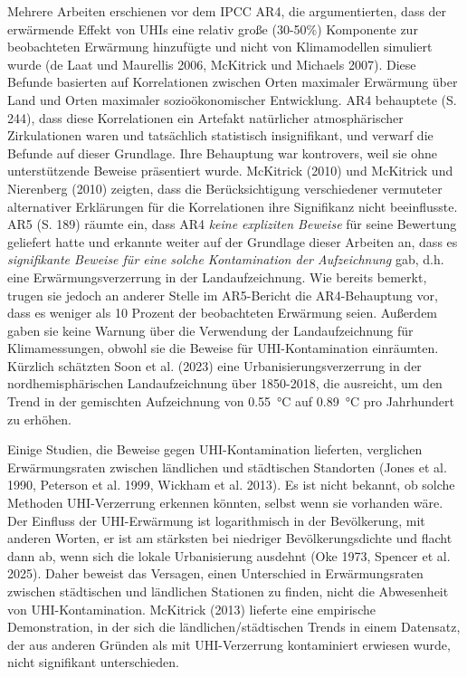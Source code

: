 \documentclass[12pt,paper=a4,DIV=12,parskip=never,chapterprefix=false,headings=standardclasses]{scrreprt}
\numberwithin{figure}{chapter}
\begin{document}
Mehrere Arbeiten erschienen vor dem IPCC AR4, die argumentierten, dass der erwärmende Effekt von UHIs eine relativ große (30-50\%) Komponente zur beobachteten Erwärmung hinzufügte und nicht von Klimamodellen simuliert wurde (de Laat und Maurellis 2006, McKitrick und Michaels 2007). Diese Befunde basierten auf Korrelationen zwischen Orten maximaler Erwärmung über Land und Orten maximaler sozioökonomischer Entwicklung. AR4 behauptete (S. 244), dass diese Korrelationen ein Artefakt natürlicher atmosphärischer Zirkulationen waren und tatsächlich statistisch insignifikant, und verwarf die Befunde auf dieser Grundlage. Ihre Behauptung war kontrovers, weil sie ohne unterstützende Beweise präsentiert wurde. McKitrick (2010) und McKitrick und Nierenberg (2010) zeigten, dass die Berücksichtigung verschiedener vermuteter alternativer Erklärungen für die Korrelationen ihre Signifikanz nicht beeinflusste. AR5 (S. 189) räumte ein, dass AR4 \emph{keine expliziten Beweise} für seine Bewertung geliefert hatte und erkannte weiter auf der Grundlage dieser Arbeiten an, dass es \emph{signifikante Beweise für eine solche Kontamination der Aufzeichnung} gab, d.h. eine Erwärmungsverzerrung in der Landaufzeichnung. Wie bereits bemerkt, trugen sie jedoch an anderer Stelle im AR5-Bericht die AR4-Behauptung vor, dass es weniger als 10 Prozent der beobachteten Erwärmung seien. Außerdem gaben sie keine Warnung über die Verwendung der Landaufzeichnung für Klimamessungen, obwohl sie die Beweise für UHI-Kontamination einräumten. Kürzlich schätzten Soon et al. (2023) eine Urbanisierungsverzerrung in der nordhemisphärischen Landaufzeichnung über 1850-2018, die ausreicht, um den Trend in der gemischten Aufzeichnung von \SI{0.55}{\celsius} auf \SI{0.89}{\celsius} pro Jahrhundert zu erhöhen.

Einige Studien, die Beweise gegen UHI-Kontamination lieferten, verglichen Erwärmungsraten zwischen ländlichen und städtischen Standorten (Jones et al. 1990, Peterson et al. 1999, Wickham et al. 2013). Es ist nicht bekannt, ob solche Methoden UHI-Verzerrung erkennen könnten, selbst wenn sie vorhanden wäre. Der Einfluss der UHI-Erwärmung ist logarithmisch in der Bevölkerung, mit anderen Worten, er ist am stärksten bei niedriger Bevölkerungsdichte und flacht dann ab, wenn sich die lokale Urbanisierung ausdehnt (Oke 1973, Spencer et al. 2025). Daher beweist das Versagen, einen Unterschied in Erwärmungsraten zwischen städtischen und ländlichen Stationen zu finden, nicht die Abwesenheit von UHI-Kontamination. McKitrick (2013) lieferte eine empirische Demonstration, in der sich die ländlichen/städtischen Trends in einem Datensatz, der aus anderen Gründen als mit UHI-Verzerrung kontaminiert erwiesen wurde, nicht signifikant unterschieden.
\end{document}
